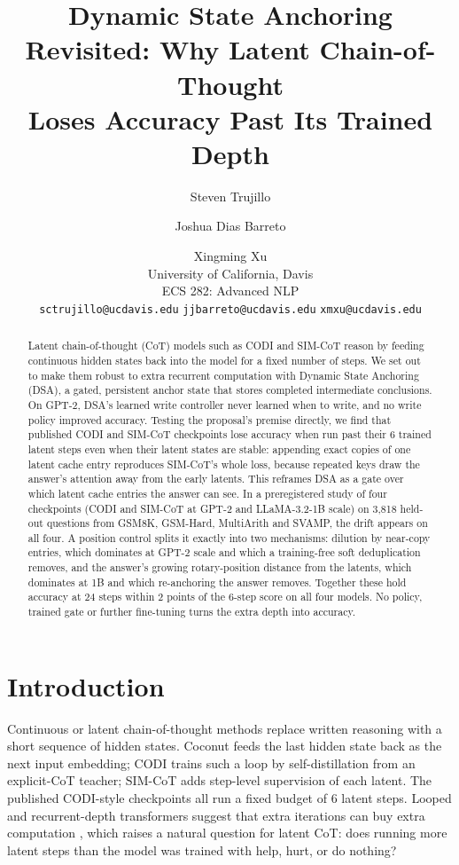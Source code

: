\documentclass[11pt]{article}
\title{Dynamic State Anchoring Revisited: Why Latent Chain-of-Thought\\Loses Accuracy Past Its Trained Depth}
\author{Steven Trujillo \and Joshua Dias Barreto \and Xingming Xu \\
  University of California, Davis \\
  ECS 282: Advanced NLP \\
  \texttt{sctrujillo@ucdavis.edu} \quad \texttt{jjbarreto@ucdavis.edu} \quad \texttt{xmxu@ucdavis.edu}}
\begin{document}
\maketitle

\begin{abstract}
Latent chain-of-thought (CoT) models such as CODI and SIM-CoT reason by feeding continuous hidden states back into the model
for a fixed number of steps. We set out to make them robust to extra recurrent computation with Dynamic State Anchoring
(DSA), a gated, persistent anchor state that stores completed intermediate conclusions. On GPT-2, DSA's learned write
controller never learned when to write, and no write policy improved accuracy. Testing the proposal's premise directly, we
find that published CODI and SIM-CoT checkpoints lose accuracy when run past their 6 trained latent steps even when their
latent states are stable: appending exact copies of one latent cache entry reproduces SIM-CoT's whole loss, because repeated
keys draw the answer's attention away from the early latents. This reframes DSA as a gate over which latent cache entries
the answer can see. In a preregistered study of four checkpoints (CODI and SIM-CoT at GPT-2 and LLaMA-3.2-1B scale) on 3,818
held-out questions from GSM8K, GSM-Hard, MultiArith and SVAMP, the drift appears on all four. A position control splits it
exactly into two mechanisms: dilution by near-copy entries, which dominates at GPT-2 scale and which a training-free soft
deduplication removes, and the answer's growing rotary-position distance from the latents, which dominates at 1B and which
re-anchoring the answer removes. Together these hold accuracy at 24 steps within 2 points of the 6-step score on all four
models. No policy, trained gate or further fine-tuning turns the extra depth into accuracy.
\end{abstract}

\section{Introduction}

Continuous or latent chain-of-thought methods replace written reasoning with a short sequence of hidden states. Coconut
\citep{hao2025coconut} feeds the last hidden state back as the next input embedding; CODI \citep{shen2025codi} trains such a
loop by self-distillation from an explicit-CoT teacher; SIM-CoT \citep{wei2025simcot} adds step-level supervision of each
latent. The published CODI-style checkpoints all run a fixed budget of 6 latent steps. Looped and recurrent-depth
transformers suggest that extra iterations can buy extra computation \citep{saunshi2025reasoning, fan2025looped}, which
raises a natural question for latent CoT: does running more latent steps than the model was trained with help, hurt, or do
nothing?
\end{document}
